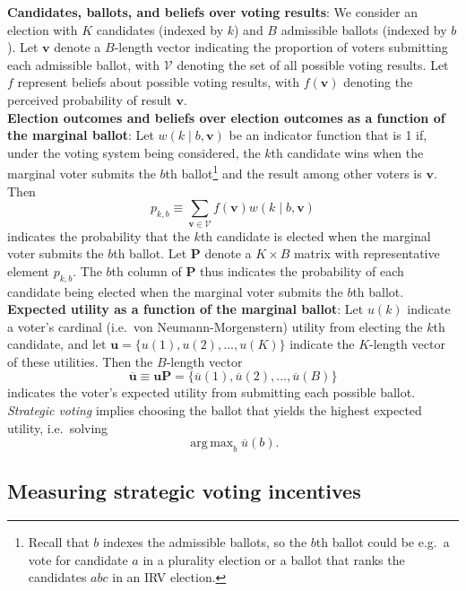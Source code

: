 \documentclass[11pt,a4paper]{article}
\DeclareMathOperator*{\argmax}{arg\,max}
\begin{document}
\noindent \textbf{Candidates, ballots, and beliefs over voting results}: We consider an election with $K$ candidates (indexed by $k$) and $B$ admissible ballots (indexed by $b$). Let $\mathbf{v}$ denote a $B$-length vector indicating the proportion of voters submitting each admissible ballot, with $\mathcal{V}$ denoting the set of all possible voting results. Let $f$ represent beliefs about possible voting results, with $f(\mathbf{v})$ denoting the perceived probability of result $\mathbf{v}$.\\

\noindent \textbf{Election outcomes and beliefs over election outcomes as a function of the marginal ballot}: Let $w(k \mid b, \mathbf{v})$ be an indicator function that is 1 if, under the voting system being considered, the $k$th candidate wins when the marginal voter submits the $b$th ballot\footnote{Recall that $b$ indexes the admissible ballots, so the $b$th ballot could be e.g.\ a vote for candidate $a$ in a plurality election or a ballot that ranks the candidates $abc$ in an IRV election.} and the result among other voters is $\mathbf{v}$. Then 
\[
p_{k,b} \equiv \sum_{\mathbf{v} \in \mathcal{V}} f(\mathbf{v}) w(k \mid b, \mathbf{v})
\]   
indicates the probability that the $k$th candidate is elected when the marginal voter submits the $b$th ballot. Let $\mathbf{P}$ denote a $K \times B$ matrix with representative element $p_{k,b}$. The $b$th column of $\mathbf{P}$ thus indicates the probability of each candidate being elected when the marginal voter submits the $b$th ballot. \\

\noindent \textbf{Expected utility as a function of the marginal ballot}: Let $u(k)$ indicate a voter's cardinal (i.e.\ von Neumann-Morgenstern) utility from electing the $k$th candidate, and let $\mathbf{u} = \{u(1), u(2), \ldots, u(K)\}$ indicate the $K$-length vector of these utilities. Then the $B$-length vector
\[
\overline{\mathbf{u}} \equiv \mathbf{u} \mathbf{P} = \{\overline{u}(1), \overline{u}(2), \ldots, \overline{u}(B)\}  
\] 
indicates the voter's expected utility from submitting each possible ballot. \emph{Strategic voting} implies choosing the ballot that yields the highest expected utility, i.e.\ solving 
\[
\argmax_{b} \overline{u}(b).
\] 

\subsection{Measuring strategic voting incentives} %
\end{document}
